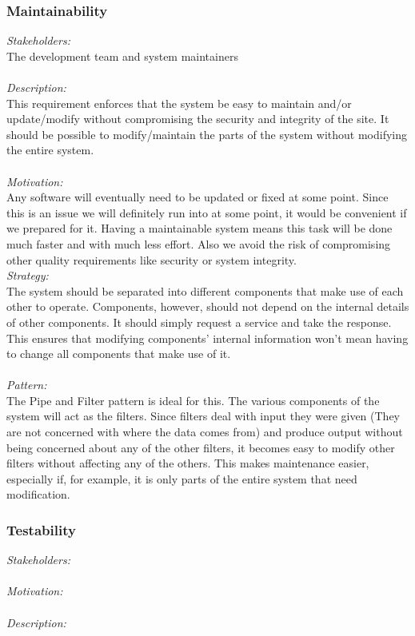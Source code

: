 \documentclass[a4paper,12pt]{report}
\begin{document}
		\subsubsection{Maintainability}
		\emph{Stakeholders: }\\ The development team and system maintainers \\ 
		\\\emph{Description: }\\ This requirement enforces that the system be easy to maintain and/or update/modify without compromising the security and integrity of the site. It should be possible to modify/maintain the parts of the system without modifying the entire system. \\
		\\\emph{Motivation: }\\ Any software will eventually need to be updated or fixed at some point. Since this is an issue we will definitely run into at some point, it would be convenient if we prepared for it. Having a maintainable system means this task will be done much faster and with much less effort. Also we avoid the risk of compromising other quality requirements like security or system integrity. \\ 
		 
		\emph{Strategy: }\\ The system should be separated into different components that make use of each other to operate. Components, however, should not depend on the internal details of other components. It should simply request a service and take the response. This ensures that modifying components’ internal information won’t mean having to change all components that make use of it. \\
		\\\emph{Pattern: }\\ The Pipe and Filter pattern is ideal for this. The various components of the system will act as the filters. Since filters deal with input they were given (They are not concerned with where the data comes from) and produce output without being concerned about any of the other filters, it becomes easy to modify other filters without affecting any of the others. This makes maintenance easier, especially if, for example, it is only parts of the entire system that need modification.		
			
		\subsubsection{Testability}
		\emph{Stakeholders: }\\ 
		\\\emph{Motivation: }\\
		\\\emph{Description: }\\
\end{document}

